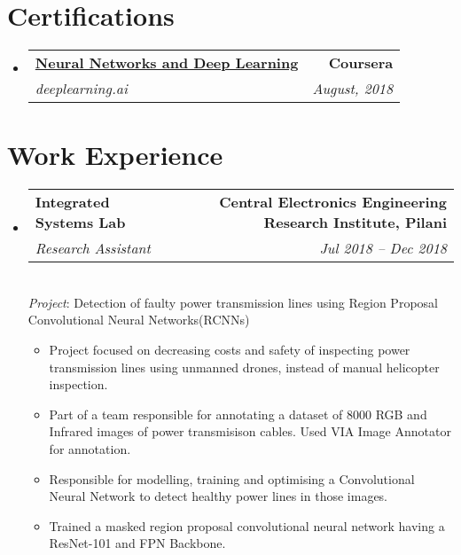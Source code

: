 \documentclass[letterpaper,11pt]{article}
\makeatletter
\newcommand{\resumeSubheadingEducation}[4]{
	\vspace{-1pt}\item
	\begin{tabular*}{0.97\textwidth}[t]{l@{\extracolsep{\fill}}r}
		\textbf{\normalsize#1} & {\normalsize #2} \\
		\textit{\small #3} & \textit{\small #4}\\
	\end{tabular*}
}
\newcommand{\resumeSubheading}[4]{
	\vspace{-1pt}\item
	\begin{tabular*}{0.97\textwidth}[t]{l@{\extracolsep{\fill}}r}
		\textbf{\normalsize #1} & {\normalsize #2} \\
		\textit{\small#3} & \textit{\small #4} \\
	\end{tabular*}
	\smallskip \\
}
\newcommand{\resumeSubItemOneArg}[1]{\item \small #1\vspace{-1pt}}
\newcommand{\resumeSubHeadingListStart}{\begin{itemize}[leftmargin=*]}
\newcommand{\resumeSubHeadingListEnd}{\end{itemize}}
\newcommand{\resumeItemListStart}{\begin{itemize} \vspace*{-5pt}}
\newcommand{\resumeItemListEnd}{\end{itemize}}
\makeatother
\begin{document}
	\section{Certifications}
	\resumeSubHeadingListStart
	\resumeSubheadingEducation
	{\href{https://www.coursera.org/account/accomplishments/certificate/KJBZ3XKKYAXM}{Neural Networks and Deep Learning}}{\textbf{Coursera}}
	{deeplearning.ai}  {August, 2018} \vspace{1pt}
	\resumeSubHeadingListEnd
	
	\section{Work Experience}
	\justifying
	\resumeSubHeadingListStart
	
	\resumeSubheading
	{Integrated Systems Lab}{\textbf{Central Electronics Engineering Research Institute, Pilani}}
	{Research Assistant}{Jul 2018 -- Dec 2018} 
	\emph{Project}: Detection of faulty power transmission lines using Region Proposal Convolutional Neural Networks(RCNNs)
	\resumeItemListStart
	\resumeSubItemOneArg{Project focused on decreasing costs and safety of inspecting power transmission lines using unmanned drones, instead of manual helicopter inspection.}
	\resumeSubItemOneArg{Part of a team responsible for annotating a dataset of 8000 RGB and Infrared images of power transmisison cables. Used VIA Image Annotator for annotation.}
	\resumeSubItemOneArg{Responsible for modelling, training and optimising a Convolutional Neural Network to detect healthy power lines in those images.}
	\resumeSubItemOneArg{Trained a masked region proposal convolutional neural network having a ResNet-101 and FPN Backbone.}
	\resumeItemListEnd
	\resumeSubHeadingListEnd
	
\end{document}
